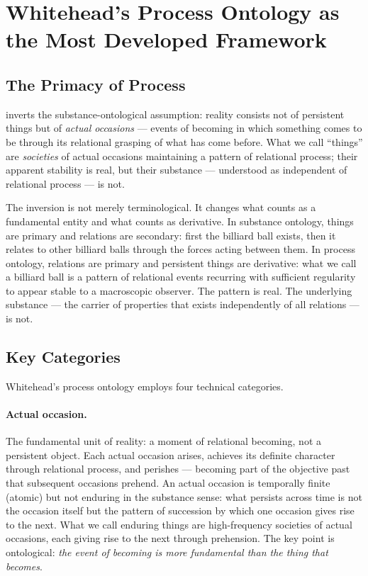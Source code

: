 
\section{Whitehead's Process Ontology as the Most Developed Framework}
\label{sec:whitehead}

\subsection{The Primacy of Process}

\citet{Whitehead1929} inverts the substance-ontological assumption:
reality consists not of persistent things but of \emph{actual occasions}
--- events of becoming in which something comes to be through its relational
grasping of what has come before.
What we call ``things'' are \emph{societies} of actual occasions maintaining
a pattern of relational process; their apparent stability is real, but their
substance --- understood as independent of relational process --- is not.

The inversion is not merely terminological.
It changes what counts as a fundamental entity and what counts as derivative.
In substance ontology, things are primary and relations are secondary:
first the billiard ball exists, then it relates to other billiard balls
through the forces acting between them.
In process ontology, relations are primary and persistent things are
derivative: what we call a billiard ball is a pattern of relational
events recurring with sufficient regularity to appear stable to a
macroscopic observer.
The pattern is real.
The underlying substance --- the carrier of properties that exists
independently of all relations --- is not.

\subsection{Key Categories}

Whitehead's process ontology employs four technical categories.

\paragraph{Actual occasion.}
The fundamental unit of reality: a moment of relational becoming, not
a persistent object.
Each actual occasion arises, achieves its definite character through
relational process, and perishes --- becoming part of the objective past
that subsequent occasions prehend.
An actual occasion is temporally finite (atomic) but not enduring in the
substance sense: what persists across time is not the occasion itself but
the pattern of succession by which one occasion gives rise to the next.
What we call enduring things are high-frequency societies of actual
occasions, each giving rise to the next through prehension.
The key point is ontological: \emph{the event of becoming is more
fundamental than the thing that becomes}.

